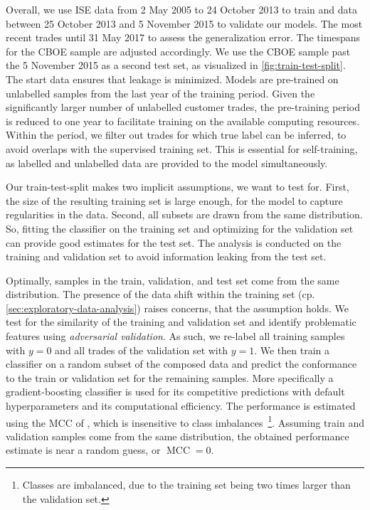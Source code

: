 Overall,  we use \gls{ISE} data from 2 May 2005 to 24 October 2013 to train and data between 25 October 2013 and 5 November 2015 to validate our models. The most recent trades until 31 May 2017 to assess the generalization error. The timespans for the \gls{CBOE} sample are adjusted accordingly. We use the \gls{CBOE} sample past the 5 November 2015 as a second test set, as visualized in \cref{fig:train-test-split}. The start data ensures that leakage is minimized. Models are pre-trained on unlabelled samples from the last year of the training period. Given the significantly larger number of unlabelled customer trades, the pre-training period is reduced to one year to facilitate training on the available computing resources. Within the period, we filter out trades for which true label can be inferred, to avoid overlaps with the supervised training set. This is essential for self-training, as labelled and unlabelled data are provided to the model simultaneously.

Our train-test-split makes two implicit assumptions, we want to test for. First, the size of the resulting training set is large enough, for the model to capture regularities in the data. Second, all subsets are drawn from the same distribution. So, fitting the classifier on the training set and optimizing for the validation set can provide good estimates for the test set. The analysis is conducted on the training and validation set to avoid information leaking from the test set.

Optimally, samples in the train, validation, and test set come from the same distribution. The presence of the data shift within the training set (cp. \cref{sec:exploratory-data-analysis}) raises concerns, that the assumption holds. We test for the similarity of the training and validation set and identify problematic features using \emph{adversarial validation}. As such, we re-label all training samples with $y=0$ and all trades of the validation set with $y=1$. We then train a classifier on a random subset of the composed data and predict the conformance to the train or validation set for the remaining samples. More specifically a gradient-boosting classifier is used for its competitive predictions with default hyperparameters and its computational efficiency. The performance is estimated using the \gls{MCC} of \textcite[][445]{matthewsComparisonPredictedObserved1975}, which is insensitive to class imbalances~\footnote{Classes are imbalanced, due to the training set being two times larger than the validation set.}. Assuming train and validation samples come from the same distribution, the obtained performance estimate is near a random guess, or $\operatorname{MCC} = 0$.

